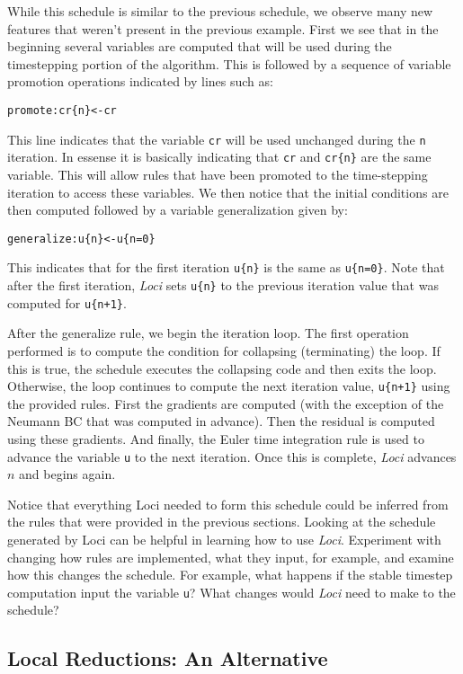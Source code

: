 \documentclass[10pt,epsf]{book}
\begin{document}
While this schedule is similar to the previous schedule, we observe
many new features that weren't present in the previous example.  First
we see that in the beginning several variables are computed that will
be used during the timestepping portion of the algorithm.  This is
followed by a sequence of variable promotion operations indicated by
lines such as:
\begin{verbatim}
promote:cr{n}<-cr
\end{verbatim}
This line indicates that the variable {\tt cr} will be used unchanged
during the {\tt n} iteration.  In essense it is basically indicating
that {\tt cr} and {\tt cr\{n\}} are the same variable.  This will
allow rules that have been promoted to the time-stepping iteration to
access these variables.  We then notice that the initial conditions
are then computed followed by a variable generalization given by:
\begin{verbatim}
generalize:u{n}<-u{n=0}
\end{verbatim}
This indicates that for the first iteration {\tt u\{n\}} is the same
as {\tt u\{n=0\}}.  Note that after the first iteration, {\it Loci}
sets {\tt u\{n\}} to the previous iteration value that was computed
for {\tt u\{n+1\}}.  

After the generalize rule, we begin the iteration loop.  The first
operation performed is to compute the condition for collapsing
(terminating) the loop.  If this is true, the schedule executes the
collapsing code and then exits the loop.  Otherwise, the loop
continues to compute the next iteration value, {\tt u\{n+1\}} using
the provided rules.  First the gradients are computed (with the
exception of the Neumann BC that was computed in advance).  Then the
residual is computed using these gradients.  And finally, the Euler
time integration rule is used to advance the variable {\tt u} to the
next iteration.  Once this is complete, {\it Loci} advances $n$ and
begins again.

Notice that everything Loci needed to form this schedule could be
inferred from the rules that were provided in the previous sections.
Looking at the schedule generated by Loci can be helpful in learning
how to use {\it Loci}.  Experiment with changing how rules are
implemented, what they input, for example, and examine how this
changes the schedule.  For example, what happens if the stable
timestep computation input the variable {\tt u}?  What changes would
{\it Loci} need to make to the schedule?

\subsection{Local Reductions: An Alternative}
\end{document}
